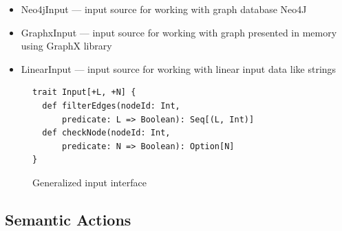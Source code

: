 \begin{itemize}
    \item Neo4jInput --- input source for working with graph database Neo4J
    \item GraphxInput --- input source for working with graph presented in memory using GraphX library
    \item LinearInput --- input source for working with linear input data like strings
\end{itemize}
\begin{figure}[h]
\begin{lstlisting}
trait Input[+L, +N] {
  def filterEdges(nodeId: Int, 
      predicate: L => Boolean): Seq[(L, Int)]
  def checkNode(nodeId: Int, 
      predicate: N => Boolean): Option[N]
}

\end{lstlisting}
\caption{Generalized input interface}
\label{fig:input}
\end{figure}


\subsection{Semantic Actions}
\label{sec:semanticActions}
